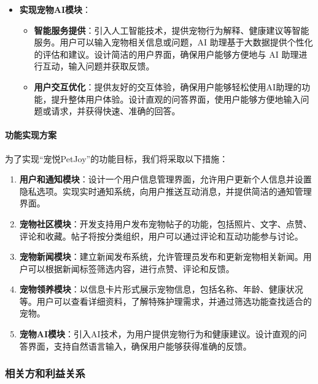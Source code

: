 \begin{itemize}
    \item \textbf{实现宠物AI模块}：
    \begin{itemize}
            \item \textbf{智能服务提供}：引入人工智能技术，提供宠物行为解释、健康建议等智能服务。用户可以输入宠物相关信息或问题，AI 助理基于大数据提供个性化的评估和建议。设计简洁的用户界面，确保用户能够方便地与 AI 助理进行互动，输入问题并获取反馈。 
            \item \textbf{用户交互优化}：提供友好的交互体验，确保用户能够轻松使用AI助理的功能，提升整体用户体验。设计直观的问答界面，使用户能够方便地输入问题或请求，并获得快速、准确的回答。
    \end{itemize}
\end{itemize}

\paragraph{功能实现方案}

为了实现“宠悦PetJoy”的功能目标，我们将采取以下措施：

\begin{enumerate}
    \item \textbf{用户和通知模块}：设计一个用户信息管理界面，允许用户更新个人信息并设置隐私选项。实现实时通知系统，向用户推送互动消息，并提供简洁的通知管理界面。

    \item \textbf{宠物社区模块}：开发支持用户发布宠物帖子的功能，包括照片、文字、点赞、评论和收藏。帖子将按分类组织，用户可以通过评论和互动功能参与讨论。

    \item \textbf{宠物新闻模块}：建立新闻发布系统，允许管理员发布和更新宠物相关新闻。用户可以根据新闻标签筛选内容，进行点赞、评论和反馈。

    \item \textbf{宠物领养模块}：以信息卡片形式展示宠物信息，包括名称、年龄、健康状况等。用户可以查看详细资料，了解特殊护理需求，并通过筛选功能查找适合的宠物。

    \item \textbf{宠物AI模块}：引入AI技术，为用户提供宠物行为和健康建议。设计直观的问答界面，支持自然语言输入，确保用户能够获得准确的反馈。
\end{enumerate}

\subsubsection{相关方和利益关系}

